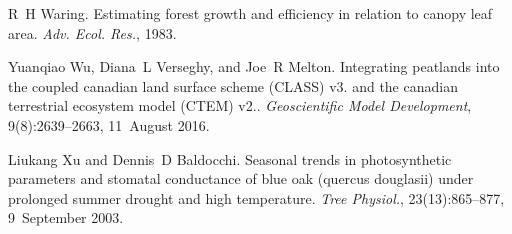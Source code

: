 \begin{DoxyDescription}
\item[\label{_CITEREF_Waring1983-wc}%
\mbox{[}62\mbox{]}]R~H Waring. Estimating forest growth and efficiency in relation to canopy leaf area. {\itshape Adv. Ecol. Res.}, 1983. 


\item[\label{_CITEREF_Wu2016-zt}%
\mbox{[}63\mbox{]}]Yuanqiao Wu, Diana~L Verseghy, and Joe~R Melton. Integrating peatlands into the coupled canadian land surface scheme (C\+L\+A\+S\+S) v3. and the canadian terrestrial ecosystem model (C\+T\+E\+M) v2.. {\itshape Geoscientific Model Development}, 9(8)\+:2639--2663, 11~August 2016. 


\item[\label{_CITEREF_Xu2003-d75}%
\mbox{[}64\mbox{]}]Liukang Xu and Dennis~D Baldocchi. Seasonal trends in photosynthetic parameters and stomatal conductance of blue oak (quercus douglasii) under prolonged summer drought and high temperature. {\itshape Tree Physiol.}, 23(13)\+:865--877, 9~September 2003.


\end{DoxyDescription}